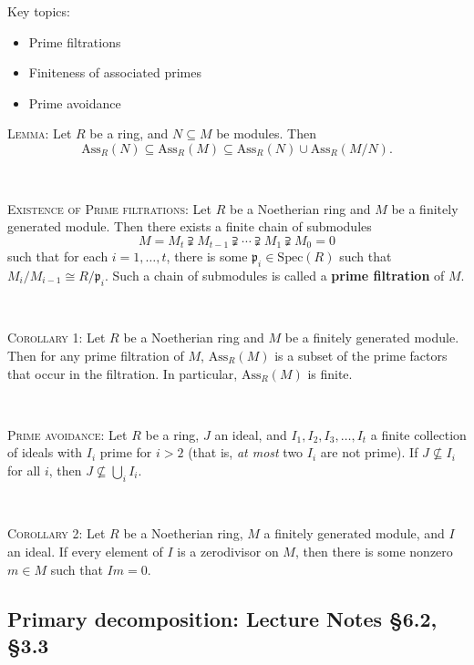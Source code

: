 \documentclass[12pt]{amsart}
\newcommand{\p}{\mathfrak{p}}
\newcommand{\Spec}{\mathrm{Spec}}
\newcommand{\Ass}{\mathrm{Ass}}
\newcommand{\0}{$\phantom{.}$}
\newcommand{\1}{\mathbbm{1}}
\begin{document}
  \begin{framed} Key topics:
\begin{itemize}
\item Prime filtrations
\item Finiteness of associated primes
\item Prime avoidance
\end{itemize}
\end{framed}





\noindent \textsc{Lemma:} Let $R$ be a ring, and $N\subseteq M$ be modules. Then
\[ \Ass_R(N) \subseteq \Ass_R(M) \subseteq \Ass_R(N) \cup \Ass_R(M/N).\]

\

\noindent \textsc{Existence of Prime filtrations:} Let $R$ be a Noetherian ring and $M$ be a finitely generated module. Then there exists a finite chain of submodules
\[ M= M_t \supsetneqq M_{t-1} \supsetneqq \cdots \supsetneqq M_{1} \supsetneqq M_0 = 0 \]
such that for each $i=1,\dots,t$, there is some $\p_i\in \Spec(R)$ such that $M_i / M_{i-1} \cong R/\p_i$.
Such a chain of submodules is called a \textbf{prime filtration} of $M$.

\

\noindent \textsc{Corollary 1:} Let $R$ be a Noetherian ring and $M$ be a finitely generated module. Then for any prime filtration of $M$, $\Ass_R(M)$ is a subset of the prime factors that occur in the filtration. In particular, $\Ass_R(M)$ is finite.

\

\noindent \textsc{Prime avoidance:} Let $R$ be a ring, $J$ an ideal, and $I_1,I_2,I_3,\dots,I_t$ a finite collection of ideals with $I_i$ prime for $i>2$ (that is, \emph{at most} two $I_i$ are not prime). If $J\not\subseteq I_i$ for all $i$, then $J \not\subseteq \bigcup_i I_i$.

\

\noindent \textsc{Corollary 2:} Let $R$ be a Noetherian ring, $M$ a finitely generated module, and $I$ an ideal. If every element of $I$ is a zerodivisor on $M$, then there is some nonzero $m\in M$ such that $Im=0$.



\newpage

\subsection{Primary decomposition: Lecture Notes \S6.2, \S3.3}\0
 
\end{document}
